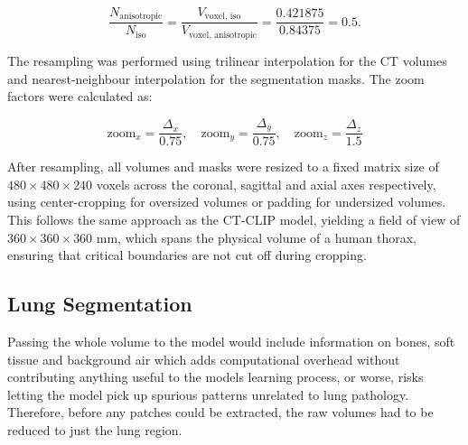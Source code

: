 \begin{equation}[Voxel Count Reduction Ratio]
\frac{N_{\text{anisotropic}}}{N_{\text{iso}}}
=
\frac{V_{\text{voxel, iso}}}
     {V_{\text{voxel, anisotropic}}}
=
\frac{0.421875}{0.84375}
=
0.5.
\end{equation}


The resampling was performed using trilinear interpolation for the CT volumes and
nearest-neighbour interpolation for the segmentation masks. The zoom factors were calculated as:

\begin{equation}[Resampling Zoom Factors]
\text{zoom}_x = \frac{\Delta_x}{0.75}, \quad
\text{zoom}_y = \frac{\Delta_y}{0.75}, \quad
\text{zoom}_z = \frac{\Delta_z}{1.5}
\end{equation}



After resampling, all volumes and masks were resized to a fixed matrix size of $ 480 \times 480 \times 240 $ voxels across the
coronal, sagittal and axial axes respectively, using center-cropping for oversized volumes or padding for undersized volumes.
This follows the same approach as the CT-CLIP model, yielding a field of view of $360 \times 360 \times 360$ mm, which spans
the physical volume of a human thorax, ensuring that critical boundaries are not cut off during cropping.

\subsection{Lung Segmentation}

Passing the whole volume to the model would include information on bones,
soft tissue and background air which adds
computational overhead without contributing anything useful to the models
learning process, or worse, risks letting the model
pick up spurious patterns unrelated to lung pathology.
Therefore, before any patches could be extracted, the raw volumes had to 
be reduced to just the lung region.


